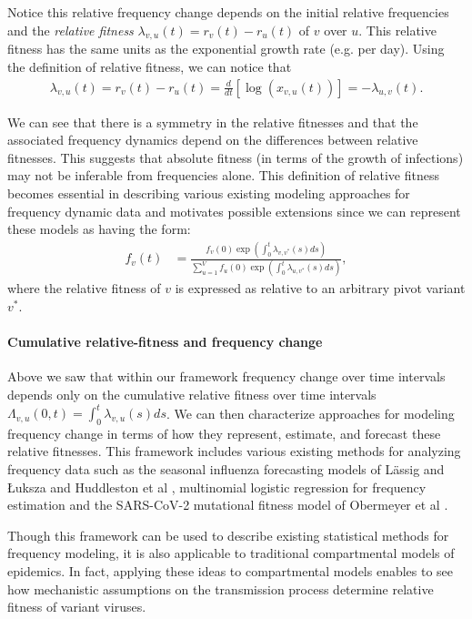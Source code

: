 \documentclass[11pt,oneside,letterpaper]{article}
\begin{document}
Notice this relative frequency change depends on the initial relative frequencies and the \emph{relative fitness} $\lambda_{v,u}(t) = r_{v}(t) - r_{u}(t)$ of $v$ over $u$.
This relative fitness has the same units as the exponential growth rate (e.g. per day).
Using the definition of relative fitness, we can notice that
\begin{align}
\lambda_{v, u}(t) = r_{v}(t) - r_{u}(t) = \frac{d }{d t} \left[\log \left( x_{v,u}(t) \right) \right] = - \lambda_{u,v}(t).
\end{align}

We can see that there is a symmetry in the relative fitnesses and that the associated frequency dynamics depend on the differences between relative fitnesses.
This suggests that absolute fitness (in terms of the growth of infections) may not be inferable from frequencies alone.
This definition of relative fitness becomes essential in describing various existing modeling approaches for frequency dynamic data and motivates possible extensions since we can represent these models as having the form:
\begin{align}
    f_{v}(t) &= \frac{ f_{v}(0) \exp( \int_{0}^{t} \lambda_{v, v^*}(s) ds)}{\sum_{u=1}^{V}  f_{u}(0) \exp( \int_{0}^{t} \lambda_{u, v^*}(s) ds)},
\end{align}
where the relative fitness of $v$ is expressed as relative to an arbitrary pivot variant $v^*$.

\paragraph{Cumulative relative-fitness and frequency change}

Above we saw that within our framework frequency change over time intervals depends only on the cumulative relative fitness over time intervals $\Lambda_{v,u}(0, t) = \int_{0}^{t} \lambda_{v, u}(s)ds$.
We can then characterize approaches for modeling frequency change in terms of how they represent, estimate, and forecast these relative fitnesses.
This framework includes various existing methods for analyzing frequency data such as the seasonal influenza forecasting models of L{\"a}ssig and {\L}uksza \cite{luksza2014predictive} and Huddleston et al \cite{Huddleston2020}, multinomial logistic regression for frequency estimation \cite{Annavajhala2021} and the SARS-CoV-2 mutational fitness model of Obermeyer et al \cite{Obermeyer2022}.

Though this framework can be used to describe existing statistical methods for frequency modeling, it is also applicable to traditional compartmental models of epidemics.
In fact, applying these ideas to compartmental models enables to see how mechanistic assumptions on the transmission process determine relative fitness of variant viruses.
\end{document}
